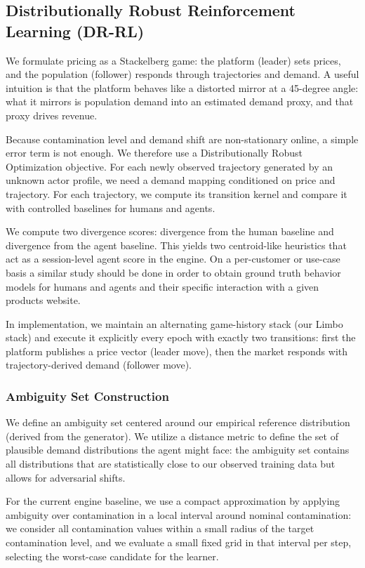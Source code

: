 \subsection{Distributionally Robust Reinforcement Learning (DR-RL)}

We formulate pricing as a Stackelberg game: the platform (leader) sets prices, and the population (follower) responds through trajectories and demand. A useful intuition is that the platform behaves like a distorted mirror at a 45-degree angle: what it mirrors is population demand into an estimated demand proxy, and that proxy drives revenue.

Because contamination level and demand shift are non-stationary online, a simple error term is not enough. We therefore use a Distributionally Robust Optimization objective. For each newly observed trajectory generated by an unknown actor profile, we need a demand mapping conditioned on price and trajectory. For each trajectory, we compute its transition kernel and compare it with controlled baselines for humans and agents.

We compute two divergence scores: divergence from the human baseline and divergence from the agent baseline. This yields two centroid-like heuristics that act as a session-level agent score in the engine. On a per-customer or use-case basis a similar study should be done in order to obtain ground truth behavior models for humans and agents and their specific interaction with a given products website.

In implementation, we maintain an alternating game-history stack (our Limbo stack) and execute it explicitly every epoch with exactly two transitions: first the platform publishes a price vector (leader move), then the market responds with trajectory-derived demand (follower move).

\subsubsection{Ambiguity Set Construction}

We define an ambiguity set centered around our empirical reference distribution (derived from the generator). We utilize a distance metric to define the set of plausible demand distributions the agent might face: the ambiguity set contains all distributions that are statistically close to our observed training data but allows for adversarial shifts.

For the current engine baseline, we use a compact approximation by applying ambiguity over contamination in a local interval around nominal contamination: we consider all contamination values within a small radius of the target contamination level, and we evaluate a small fixed grid in that interval per step, selecting the worst-case candidate for the learner.

